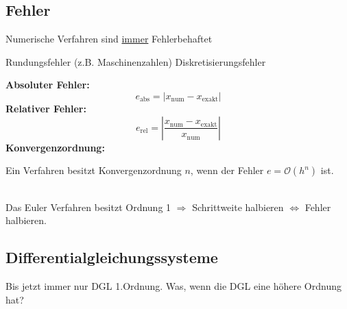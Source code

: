 \subsection{Fehler}
Numerische Verfahren sind \underline{immer} Fehlerbehaftet
\begin{outline}
    \1 Rundungsfehler (z.B. Maschinenzahlen)
    \1 Diskretisierungsfehler
\end{outline}
\begin{center}
\end{center}

\textbf{Absoluter Fehler:}
\begin{equation*}
    e_{\text{abs}} = \left| x_{\text{num}} - x_{\text{exakt}} \right|
\end{equation*}
\textbf{Relativer Fehler:}
\begin{equation*}
    e_{\text{rel}} = \left| \frac{x_{\text{num}} - x_{\text{exakt}}}
                            {x_{\text{num}}}\right|
\end{equation*}
\textbf{Konvergenzordnung:}

Ein Verfahren besitzt Konvergenzordnung $n$, wenn der Fehler $e =
\mathcal{O}\left( h^n \right)$ ist.

\\
Das Euler Verfahren besitzt Ordnung 1 $\Rightarrow$ Schrittweite halbieren
$\Leftrightarrow$ Fehler halbieren.

\subsection{Differentialgleichungssysteme}
Bis jetzt immer nur DGL 1.Ordnung. Was, wenn die DGL eine höhere Ordnung hat?

